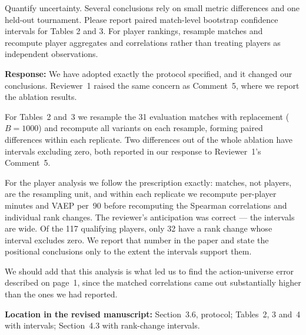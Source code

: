 \documentclass[11pt,a4paper]{article}
\newcommand{\response}[2]{%
  \begin{responsebox}
  \textbf{Response:}
  #1
  \end{responsebox}
  \begin{locationbox}
  \textbf{Location in the revised manuscript:}
  #2
  \end{locationbox}
}
\begin{document}
\begin{reviewbox}
Quantify uncertainty. Several conclusions rely on small metric differences and one held-out tournament. Please report paired match-level bootstrap confidence intervals for Tables 2 and 3. For player rankings, resample matches and recompute player aggregates and correlations rather than treating players as independent observations.
\end{reviewbox}
\response{We have adopted exactly the protocol specified, and it changed our conclusions. Reviewer~1 raised the same concern as Comment~5, where we report the ablation results.

For Tables~2 and~3 we resample the 31 evaluation matches with replacement ($B = 1000$) and recompute all variants on each resample, forming paired differences within each replicate. Two differences out of the whole ablation have intervals excluding zero, both reported in our response to Reviewer~1's Comment~5.

For the player analysis we follow the prescription exactly: matches, not players, are the resampling unit, and within each replicate we recompute per-player minutes and VAEP per~90 before recomputing the Spearman correlations and individual rank changes. The reviewer's anticipation was correct --- the intervals are wide. Of the 117 qualifying players, only 32 have a rank change whose interval excludes zero. We report that number in the paper and state the positional conclusions only to the extent the intervals support them.

We should add that this analysis is what led us to find the action-universe error described on page~1, since the matched correlations came out substantially higher than the ones we had reported.}{Section~3.6, protocol; Tables~2, 3 and~4 with intervals; Section~4.3 with rank-change intervals.}
\end{document}
